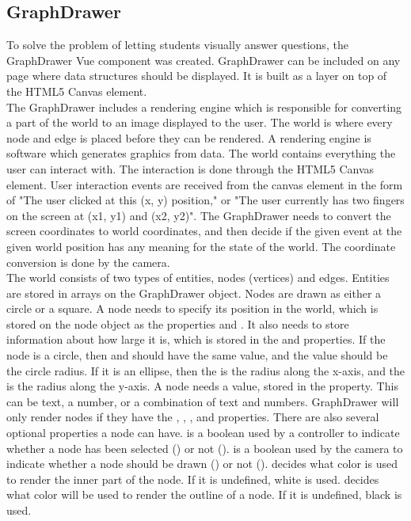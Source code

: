 \subsection{GraphDrawer}
To solve the problem of letting students visually answer questions, the GraphDrawer Vue component was created. GraphDrawer can be included on any page where data structures should be displayed. It is built as a layer on top of the HTML5 Canvas element.
\\[11pt]
The GraphDrawer includes a rendering engine which is responsible for converting a part of the world to an image displayed to the user. The world is where every node and edge is placed before they can be rendered. A rendering engine is software which generates graphics from data. The world contains everything the user can interact with. The interaction is done through the HTML5 Canvas element. User interaction events are received from the canvas element in the form of "The user clicked at this (x, y) position," or "The user currently has two fingers on the screen at (x1, y1) and (x2, y2)". The GraphDrawer needs to convert the screen coordinates to world coordinates, and then decide if the given event at the given world position has any meaning for the state of the world. The coordinate conversion is done by the camera.
\\[11pt]
The world consists of two types of entities, nodes (vertices) and edges. Entities are stored in arrays on the GraphDrawer object. Nodes are drawn as either a circle or a square. A node needs to specify its position in the world, which is stored on the node object as the properties  and . It also needs to store information about how large it is, which is stored in the  and  properties. If the node is a circle, then  and  should have the same value, and the value should be the circle radius. If it is an ellipse, then the  is the radius along the x-axis, and the  is the radius along the y-axis. A node needs a value, stored in the  property. This can be text, a number, or a combination of text and numbers. GraphDrawer will only render nodes if they have the , , ,  and  properties. There are also several optional properties a node can have.  is a boolean used by a controller to indicate whether a node has been selected () or not ().  is a boolean used by the camera to indicate whether a node should be drawn () or not ().  decides what color is used to render the inner part of the node. If it is undefined, white is used.  decides what color will be used to render the outline of a node. If it is undefined, black is used.
